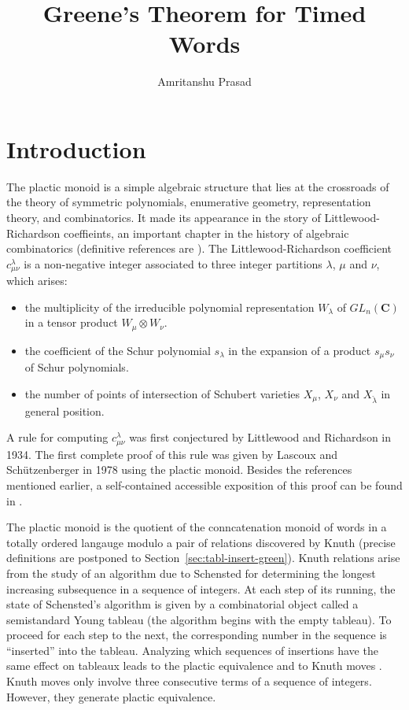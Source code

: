\documentclass[10pt]{amsproc}
\title{Greene's Theorem for Timed Words}
\author{Amritanshu Prasad}
\theoremstyle{definition}
\theoremstyle{remark}
\begin{document}
\maketitle

\section{Introduction}
\label{sec:intro}
The plactic monoid is a simple algebraic structure that lies at the crossroads of the theory of symmetric polynomials, enumerative geometry, representation theory, and combinatorics.
It made its appearance in the story of Littlewood-Richardson coeffieints, an important chapter in the history of algebraic combinatorics (definitive references are \cite{fulton,manivel}).
The Littlewood-Richardson coefficient $c^\lambda_{\mu\nu}$ is a non-negative integer associated to three integer partitions $\lambda$, $\mu$ and $\nu$, which arises:
\begin{itemize}
\item the multiplicity of the irreducible polynomial representation $W_\lambda$ of $GL_n(\mathbf C)$ in a tensor product $W_\mu\otimes W_\nu$.
\item the coefficient of the Schur polynomial $s_\lambda$ in the expansion of a product $s_\mu s_\nu$ of Schur polynomials.
\item the number of points  of intersection of Schubert varieties $X_\mu$, $X_\nu$ and $X_{\check\lambda}$ in general position.
\end{itemize}
A rule for computing $c^\lambda_{\mu\nu}$ was first conjectured by Littlewood and Richardson in 1934.
The first complete proof of this rule was given by Lascoux and Sch\"utzenberger \cite{plaxique} in 1978 using the plactic monoid.
Besides the references mentioned earlier, a self-contained accessible exposition of this proof can be found in \cite{schur_poly}.

The plactic monoid is the quotient of the conncatenation monoid of words in a totally ordered langauge modulo a pair of relations discovered by Knuth (precise definitions are postponed to Section~\ref{sec:tabl-insert-green}).
Knuth relations arise from the study of an algorithm due to Schensted \cite{schensted} for determining the longest increasing subsequence in a sequence of integers.
At each step of its running, the state of Schensted's algorithm is given by a combinatorial object called a semistandard Young tableau (the algorithm begins with the empty tableau).
To proceed for each step to the next, the corresponding number in the sequence is ``inserted'' into the tableau.
Analyzing which sequences of insertions have the same effect on tableaux leads to the plactic equivalence and to Knuth moves \cite[Section~6]{knuth}.
Knuth moves only involve three consecutive terms of a sequence of integers.
However, they generate plactic equivalence.
\end{document}

